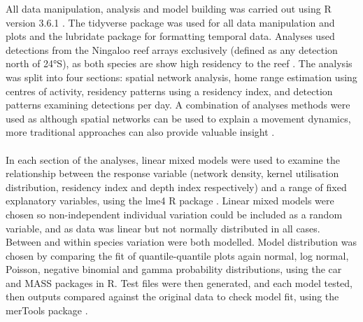 \documentclass[11pt,a4paper]{article}
\begin{document}
	All data manipulation, analysis and model building was carried out using R version 3.6.1 \citep{RCoreTeam2015}. The tidyverse package \citep{Wickham2017} was used for all data manipulation and plots and the lubridate package \citep{Grolemund2011} for formatting temporal data. Analyses used detections from the Ningaloo reef arrays exclusively (defined as any detection north of 24°S), as both species are show high residency to the reef \citep{Braccini2017}. The analysis was split into four sections: spatial network analysis, home range estimation using centres of activity, residency patterns using a residency index, and detection patterns examining detections per day. A combination of analyses methods were used as although spatial networks can be used to explain a movement dynamics, more traditional approaches can also provide valuable insight \citep{Baeyaert2018}. \\
	\\
	In each section of the analyses, linear mixed models were used to examine the relationship between the response variable (network density, kernel utilisation distribution, residency index and depth index respectively) and a range of fixed explanatory variables, using the lme4 R package \citep{Bates2015}. Linear mixed models were chosen so non-independent individual variation could be included as a random variable, and as data was linear but not normally distributed in all cases. Between and within species variation were both modelled. Model distribution was chosen by comparing the fit of quantile-quantile plots again normal, log normal, Poisson, negative binomial and gamma probability distributions, using the car \citep{Fox2019} and MASS \citep{Venables2002} packages in R. Test files were then generated, and each model tested, then outputs compared against the original data to check model fit, using the merTools package \citep{Knowles2019}.\\
	\\
\end{document}

